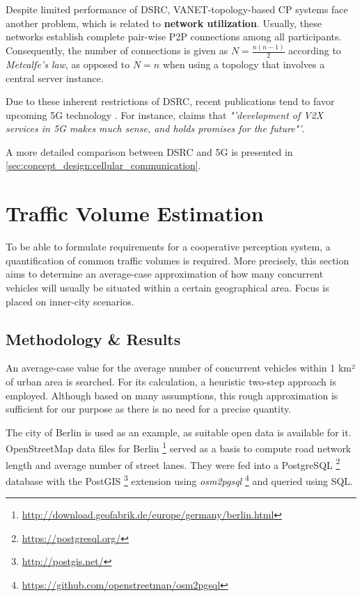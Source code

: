 Despite limited performance of DSRC, VANET-topology-based CP systems face another problem, which is related to \textbf{network utilization}. Usually, these networks establish complete pair-wise P2P connections among all participants. Consequently, the number of connections is given as $N = \frac{n(n-1)}{2 }$ according to \textit{Metcalfe's law}, as opposed to $N = n$ when using a topology that involves a central server instance.

Due to these inherent restrictions of DSRC, recent publications tend to favor upcoming 5G technology \cite{Briegleb2019, 5GAutomotiveAssociation2016}. For instance, \cite{Wevers2017} claims that \textit{"'development of V2X services in 5G makes much sense, and holds promises for the future"'}.

A more detailed comparison between DSRC and 5G is presented in \cref{sec:concept_design:cellular_communication}.

\section{Traffic Volume Estimation}
\label{sec:problem_analysis:traffic_volume_estimation}

To be able to formulate requirements for a cooperative perception system, a quantification of common traffic volumes is required. More precisely, this section aims to determine an average-case approximation of how many concurrent vehicles will usually be situated within a certain geographical area. Focus is placed on inner-city scenarios. 

\subsection{Methodology \& Results}
\label{subsec:problem_analysis:methodology_results}
An average-case value for the average number of concurrent vehicles within 1 km² of urban area is searched. For its calculation, a heuristic two-step approach is employed. Although based on many assumptions, this rough approximation is sufficient for our purpose as there is no need for a precise quantity. 

The city of Berlin is used as an example, as suitable open data is available for it. OpenStreetMap data files for Berlin \footnote{\url{http://download.geofabrik.de/europe/germany/berlin.html}} served as a basis to compute road network length and average number of street lanes. They were fed into a PostgreSQL \footnote{\url{https://postgresql.org/}} database with the PostGIS \footnote{\url{http://postgis.net/}} extension using \textit{osm2pgsql} \footnote{\url{https://github.com/openstreetmap/osm2pgsql}} and queried using SQL.


